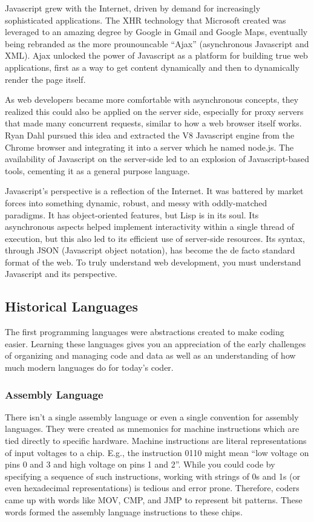 Javascript grew with the Internet, driven by demand for increasingly
sophisticated applications. The XHR technology that Microsoft created was
leveraged to an amazing degree by Google in Gmail and Google Maps, eventually
being rebranded as the more prounouncable ``Ajax'' (asynchronous Javascript and
XML). Ajax unlocked the power of Javascript as a platform for building true web
applications, first as a way to get content dynamically and then to dynamically
render the page itself.

As web developers became more comfortable with asynchronous concepts, they
realized this could also be applied on the server side, especially for proxy
servers that made many concurrent requests, similar to how a web browser itself
works. Ryan Dahl pursued this idea and extracted the V8 Javascript engine from
the Chrome browser and integrating it into a server which he named node.js. The
availability of Javascript on the server-side led to an explosion of
Javascript-based tools, cementing it as a general purpose language.

Javascript's perspective is a reflection of the Internet. It was battered by
market forces into something dynamic, robust, and messy with oddly-matched
paradigms. It has object-oriented features, but Lisp is in its soul. Its
asynchronous aspects helped implement interactivity within a single thread of
execution, but this also led to its efficient use of server-side resources. Its
syntax, through JSON (Javascript object notation), has become the de facto
standard format of the web. To truly understand web development, you must
understand Javascript and its perspective.

\subsection{Historical Languages}

The first programming languages were abstractions created to make coding
easier. Learning these languages gives you an appreciation of the early
challenges of organizing and managing code and data as well as an understanding
of how much modern languages do for today's coder.

\subsubsection{Assembly Language}

There isn't a single assembly language or even a single convention for assembly
languages. They were created as mnemonics for machine instructions which are
tied directly to specific hardware. Machine instructions are literal
representations of input voltages to a chip. E.g., the instruction 0110 might
mean ``low voltage on pins 0 and 3 and high voltage on pins 1 and 2''. While you
could code by specifying a sequence of such instructions, working with strings
of 0s and 1s (or even hexadecimal representations) is tedious and error prone.
Therefore, coders came up with words like MOV, CMP, and JMP to represent bit
patterns. These words formed the assembly language instructions to these chips.

